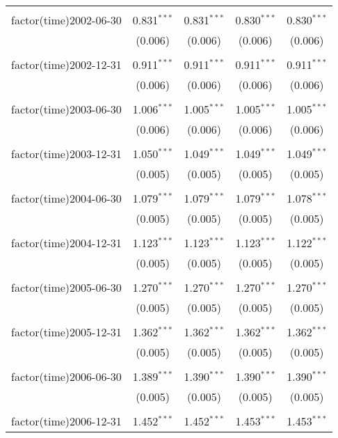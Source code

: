 \begin{table}[!htbp]
\begin{tabular}{@{\extracolsep{5pt}}lcccc}
  & & & & \\ 
 factor(time)2002-06-30 & 0.831$^{***}$ & 0.831$^{***}$ & 0.830$^{***}$ & 0.830$^{***}$ \\ 
  & (0.006) & (0.006) & (0.006) & (0.006) \\ 
  & & & & \\ 
 factor(time)2002-12-31 & 0.911$^{***}$ & 0.911$^{***}$ & 0.911$^{***}$ & 0.911$^{***}$ \\ 
  & (0.006) & (0.006) & (0.006) & (0.006) \\ 
  & & & & \\ 
 factor(time)2003-06-30 & 1.006$^{***}$ & 1.005$^{***}$ & 1.005$^{***}$ & 1.005$^{***}$ \\ 
  & (0.006) & (0.006) & (0.006) & (0.006) \\ 
  & & & & \\ 
 factor(time)2003-12-31 & 1.050$^{***}$ & 1.049$^{***}$ & 1.049$^{***}$ & 1.049$^{***}$ \\ 
  & (0.005) & (0.005) & (0.005) & (0.005) \\ 
  & & & & \\ 
 factor(time)2004-06-30 & 1.079$^{***}$ & 1.079$^{***}$ & 1.079$^{***}$ & 1.078$^{***}$ \\ 
  & (0.005) & (0.005) & (0.005) & (0.005) \\ 
  & & & & \\ 
 factor(time)2004-12-31 & 1.123$^{***}$ & 1.123$^{***}$ & 1.123$^{***}$ & 1.122$^{***}$ \\ 
  & (0.005) & (0.005) & (0.005) & (0.005) \\ 
  & & & & \\ 
 factor(time)2005-06-30 & 1.270$^{***}$ & 1.270$^{***}$ & 1.270$^{***}$ & 1.270$^{***}$ \\ 
  & (0.005) & (0.005) & (0.005) & (0.005) \\ 
  & & & & \\ 
 factor(time)2005-12-31 & 1.362$^{***}$ & 1.362$^{***}$ & 1.362$^{***}$ & 1.362$^{***}$ \\ 
  & (0.005) & (0.005) & (0.005) & (0.005) \\ 
  & & & & \\ 
 factor(time)2006-06-30 & 1.389$^{***}$ & 1.390$^{***}$ & 1.390$^{***}$ & 1.390$^{***}$ \\ 
  & (0.005) & (0.005) & (0.005) & (0.005) \\ 
  & & & & \\ 
 factor(time)2006-12-31 & 1.452$^{***}$ & 1.452$^{***}$ & 1.453$^{***}$ & 1.453$^{***}$ \\ 

\end{tabular}
\end{table}

